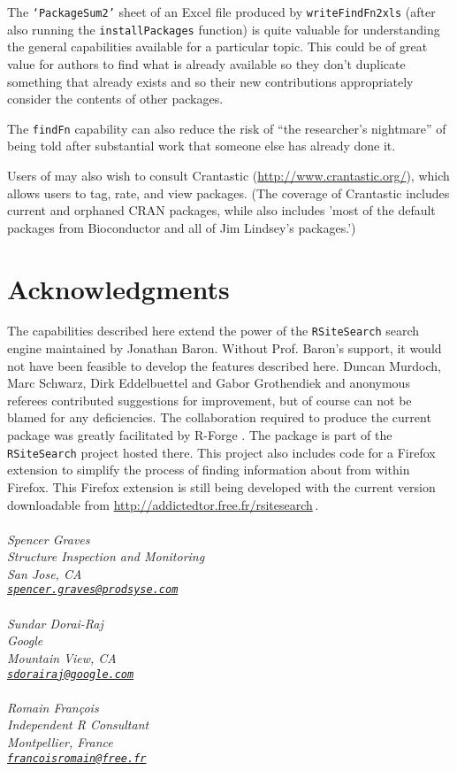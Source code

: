 The {\tt `PackageSum2'} sheet of an Excel file produced by
{\tt writeFindFn2xls} (after also running the {\tt installPackages}
function) is quite valuable for understanding the
general capabilities available for a particular topic.
This could be of great value for authors to find what is already
available so they don't duplicate something that already exists
and so their new contributions appropriately consider
the contents of other packages.

The {\tt findFn} capability can also reduce the risk
of ``the researcher's nightmare'' of being told after
substantial work that someone else has already done it.

Users of  may also wish to consult Crantastic
(\url{http://www.crantastic.org/}), which allows users to tag, rate,
and view packages.  (The coverage of Crantastic includes current and
orphaned CRAN packages, while \cite{JB09URL}
also includes 'most of the default packages from Bioconductor and all
of Jim Lindsey's packages.')


\section{Acknowledgments}
The capabilities described here extend the power of the
{\tt RSiteSearch} search engine maintained by Jonathan Baron.
Without Prof. Baron's support, it would not have been feasible
to develop the features described here. Duncan Murdoch, Marc Schwarz,
Dirk Eddelbuettel and Gabor Grothendiek and anonymous
referees contributed suggestions for improvement, but of course
can not be blamed for any deficiencies.  The collaboration
required to produce the current  package was greatly
facilitated by R-Forge \citep{RFORGE09URL}. The  package
is part of the {\tt RSiteSearch} project hosted there.  This project
also includes code for a Firefox extension to simplify the process of
finding information about \R{} from within Firefox.  This Firefox
extension is still being developed with the current version
downloadable from \url{http://addictedtor.free.fr/rsitesearch}\,.
\\ \\
\emph{Spencer Graves \\
Structure Inspection and Monitoring \\
San Jose, CA \\
{\tt\href{mailto:spencer.graves@prodsyse.com}{spencer.graves@prodsyse.com}} }
\\ \\
\emph{Sundar Dorai-Raj \\
Google \\
Mountain View, CA \\
{\tt\href{mailto:sdorairaj@google.com}{sdorairaj@google.com}} }
\\ \\
\emph{Romain Fran{\c c}ois \\
Independent R Consultant \\
Montpellier, France \\
{\tt\href{mailto:francoisromain@free.fr}{francoisromain@free.fr}} }
